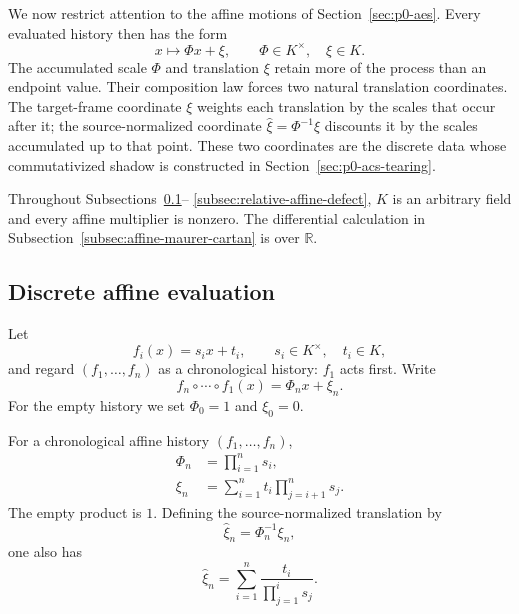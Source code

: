 We now restrict attention to the affine motions of Section~\ref{sec:p0-aes}.  Every
evaluated history then has the form
\[
  x\longmapsto \Phi x+\xi,
  \qquad \Phi\in K^\times,\quad \xi\in K.
\]
The accumulated scale $\Phi$ and translation $\xi$ retain more of the process
than an endpoint value.  Their composition law forces two natural translation
coordinates.  The target-frame coordinate $\xi$ weights each translation by
the scales that occur after it; the source-normalized coordinate
$\widehat\xi=\Phi^{-1}\xi$ discounts it by the scales accumulated up to that
point.  These two coordinates are the discrete data whose commutativized shadow
is constructed in Section~\ref{sec:p0-acs-tearing}.

Throughout Subsections~\ref{subsec:discrete-affine-cocycles}--
\ref{subsec:relative-affine-defect}, $K$ is an arbitrary field and every
affine multiplier is nonzero.  The differential calculation in
Subsection~\ref{subsec:affine-maurer-cartan} is over $\mathbb R$.

\subsection{Discrete affine evaluation}
\label{subsec:discrete-affine-cocycles}

Let
\[
  f_i(x)=s_i x+t_i,
  \qquad s_i\in K^\times,\quad t_i\in K,
\]
and regard $(f_1,\ldots,f_n)$ as a chronological history: $f_1$ acts first.
Write
\begin{equation}
  f_n\circ\cdots\circ f_1(x)=\Phi_nx+\xi_n.
  \label{eq:affine-history-normal-form}
\end{equation}
For the empty history we set $\Phi_0=1$ and $\xi_0=0$.

\begin{proposition}
\label{prop:affine-cocycle-formulas}
\label{prop:target-affine-cocycle}
\label{prop:source-normalized-cocycle}
For a chronological affine history $(f_1,\ldots,f_n)$,
\begin{align}
  \Phi_n&=\prod_{i=1}^{n}s_i,
  \label{eq:accumulated-affine-scale}\\
  \xi_n&=\sum_{i=1}^{n}t_i\prod_{j=i+1}^{n}s_j.
  \label{eq:target-affine-cocycle}
\end{align}
The empty product is $1$.  Defining the source-normalized translation by
\begin{equation}
  \widehat\xi_n=\Phi_n^{-1}\xi_n,
  \label{eq:source-normalized-translation-definition}
\end{equation}
one also has
\begin{equation}
  \widehat\xi_n
  =\sum_{i=1}^{n}\frac{t_i}{\prod_{j=1}^{i}s_j}.
  \label{eq:source-normalized-affine-cocycle}
\end{equation}
\end{proposition}

